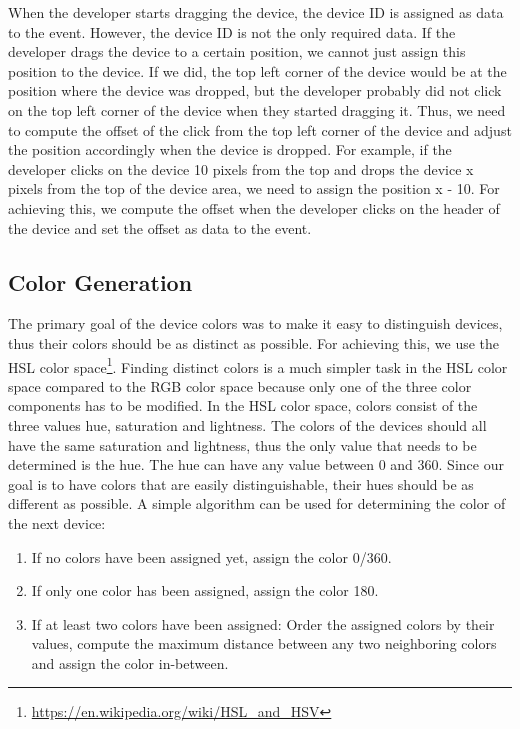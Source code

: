When the developer starts dragging the device, the device ID is assigned as data to the event. However, the device ID is not the only required data. If the developer drags the device to a certain position, we cannot just assign this position to the device. If we did, the top left corner of the device would be at the position where the device was dropped, but the developer probably did not click on the top left corner of the device when they started dragging it. Thus, we need to compute the offset of the click from the top left corner of the device and adjust the position accordingly when the device is dropped. For example, if the developer clicks on the device 10 pixels from the top and drops the device x pixels from the top of the device area, we need to assign the position x - 10. For achieving this, we compute the offset when the developer clicks on the header of the device and set the offset as data to the event.

\subsection{Color Generation}

The primary goal of the device colors was to make it easy to distinguish devices, thus their colors should be as distinct as possible. For achieving this, we use the HSL color space\footnote{\url{https://en.wikipedia.org/wiki/HSL_and_HSV}}. Finding distinct colors is a much simpler task in the HSL color space compared to the RGB color space because only one of the three color components has to be modified. In the HSL color space, colors consist of the three values hue, saturation and lightness. The colors of the devices should all have the same saturation and lightness, thus the only value that needs to be determined is the hue. The hue can have any value between 0 and 360. Since our goal is to have colors that are easily distinguishable, their hues should be as different as possible. A simple algorithm can be used for determining the color of the next device:
\begin{enumerate}
	\item If no colors have been assigned yet, assign the color 0/360.
	\item If only one color has been assigned, assign the color 180.
	\item If at least two colors have been assigned: Order the assigned colors by their values, compute the maximum distance between any two neighboring colors and assign the color in-between.
\end{enumerate}

